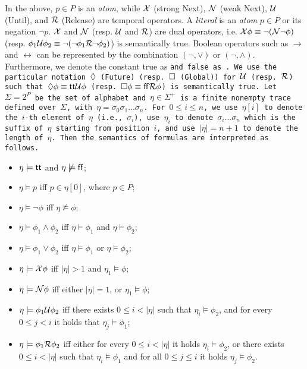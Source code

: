 In the above, $p \in P$ is an \emph{atom}, while $\X$ (strong Next), $\N$ (weak Next), $\U$ (Until), and $\R$ (Release) are temporal operators. A \emph{literal} is an \emph{atom} $p\in P$ or its negation $\neg p$. $\X$ and $\N$ (resp. $\U$ and $\R$) are dual operators, i.e. $\X\phi\equiv \neg(\N\neg\phi)$ (resp. $\phi_1\U\phi_2 \equiv \neg (\neg\phi_1 \R\neg\phi_2)$) is semantically true. Boolean operators such as $\rightarrow$ and $\leftrightarrow$ can be represented by the combination $(\neg, \vee)$ or $(\neg, \wedge)$. Furthermore, we denote the constant \textsf{true} as \tt and \textsf{false} as \ff. We use the particular notation $\F$ (Future) (resp. $\G$ (Global)) for $\U$ (resp. $\R$) such that $\F\phi \equiv \tt\U\phi$ (resp. $\G\phi \equiv \ff \R\phi$) is semantically true. Let $\Sigma = 2^P$ be the set of alphabet and $\eta\in\Sigma^+$ is a finite nonempty trace defined over $\Sigma$, with $\eta=\sigma_0\sigma_1\dots\sigma_n$. For $0\leq i\leq n$, we use $\eta[i]$ to denote the $i$-th element of $\eta$ (i.e., $\sigma_i$), use $\eta_i$ to denote $\sigma_i\dots\sigma_n$ which is the suffix of $\eta$ starting from position $i$, and use $|\eta|=n+1$ to denote the length of $\eta$. Then the semantics of \ltlf formulas are interpreted as follows.
\begin{itemize}
\item  $\eta \models \tt$ and $\eta \not\models \ff$;
\item  $\eta \models p$ iff $p \in \eta[0]$, where $p\in P$;
\item  $\eta\models\neg\phi$ iff $\eta\not\models\phi$;
\item  $\eta \models \phi_{1} \wedge \phi_{2}$ iff $\eta \models \phi_{1}$ and $\eta \models \phi_{2}$;
\item  $\eta \models \phi_{1} \vee \phi_{2}$ iff $\eta \models \phi_{1}$ or $\eta \models \phi_{2}$;
\item  $\eta \models \X \phi$ iff $|\eta|>1$ and $\eta_{1} \models \phi$;
\item  $\eta \models \N \phi$ iff either $|\eta| = 1$, or $\eta_{1} \models \phi$;
\item  $\eta \models\phi_{1} \U \phi_{2}$ iff there exists $0 \leq i<|\eta|$ such that $\eta_{i} \models \phi_{2}$, and for every $0 \leq j<i$ it holds that $\eta_{j} \models \phi_{1}$;
\item  $\eta \models\phi_{1} \R \phi_{2}$ iff either for every $0 \leq i<|\eta|$ it holds $\eta_{i}\models \phi_{2}$, or there exists $0 \leq i<|\eta|$ such that $\eta_{i} \models \phi_{1}$ and for all $0 \leq j \leq i$ it holds $\eta_{j} \models \phi_{2}$.
\end{itemize}

